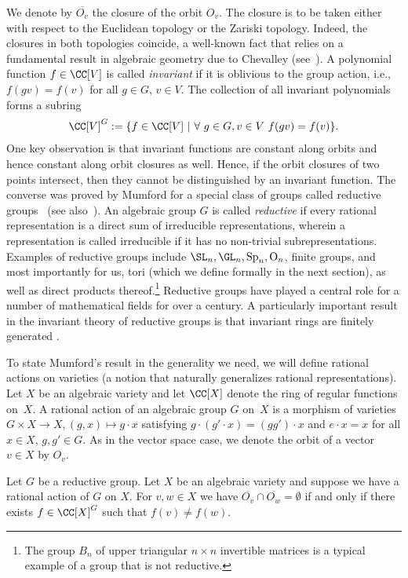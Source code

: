 We denote by $\overline{O_v}$ the closure of the orbit $O_v$.
The closure is to be taken either with respect to the Euclidean topology or the Zariski topology.
Indeed, the closures in both topologies coincide, a well-known fact that relies on a fundamental result in algebraic geometry due to Chevalley (see~\cite[I.\S10]{mumford:88}).
A polynomial function $f \in \CC[V]$ is called \emph{invariant} if it is oblivious to the group action, i.e., $f(gv) = f(v)$ for all $g \in G$, $v \in V$.
%
The collection of all invariant polynomials forms a subring
\begin{align*}
  \CC[V]^G := \{f \in \CC[V]\ |\ \forall\ g\in G, v \in V\ f(gv) = f(v) \}.
\end{align*}
One key observation is that invariant functions are constant along orbits and hence constant along orbit closures as well.
Hence, if the orbit closures of two points intersect, then they cannot be distinguished by an invariant function.
The converse was proved by Mumford for a special class of groups called reductive groups~\cite{Mumford-book} (see also~\cite[Corollary~2.3.8]{DK}).
An algebraic group $G$ is called {\em reductive} if every rational representation is a direct sum of irreducible representations,
wherein a representation is called irreducible if it has no non-trivial subrepresentations.
Examples of reductive groups include $\SL_n, \GL_n, {\rm Sp}_n, {\rm O}_n$, finite groups, and most importantly for us, tori (which we define formally in the next section),
as well as direct products thereof.\footnote{The group $B_n$ of upper triangular $n \times n$ invertible matrices is a typical example of a group that is not reductive.}
Reductive groups have played a central role for a number of mathematical fields for over a century. A particularly important result in the invariant theory of reductive groups is that invariant rings are finitely generated \cite{Hilb1, Hilb2,weyl:39}.

To state Mumford's result in the generality we need, we will define rational actions on varieties (a notion that naturally generalizes rational representations).
Let $X$ be an algebraic variety and let $\CC[X]$ denote the ring of regular functions on~$X$.
A rational action of an algebraic group $G$ on~$X$ is a morphism of varieties $G \times X \rightarrow X, (g,x) \mapsto g\cdot x$ satisfying $g \cdot (g' \cdot x) = (gg') \cdot x$ and $e \cdot x = x$ for all $x \in X$, $g,g' \in G$.
As in the vector space case, we denote the orbit of a vector~$v\in X$ by $O_v$.

\begin{theorem}\label{thm:Mumford}
Let $G$ be a reductive group. Let $X$ be an algebraic variety and suppose we have a rational action of $G$ on $X$. For $v,w \in X$ we have
$\overline{O_v} \cap \overline{O_w} = \emptyset$ if and only if there exists $f \in \CC[X]^G$ such that $f(v) \neq f(w)$.
\end{theorem}

